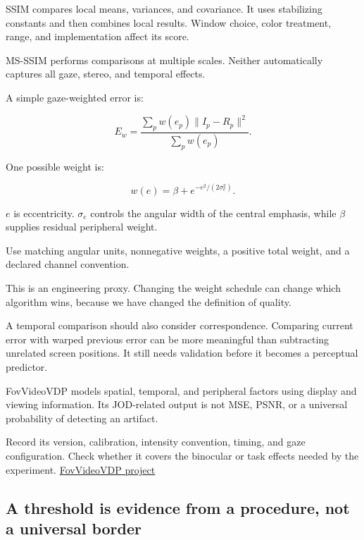 \hypertarget{04-visual-computing-ii-ch043-structural-and-gaze-aware-comparisons-add-assumptions}{}

SSIM compares local means, variances, and covariance. It uses stabilizing constants and then combines local results. Window choice, color treatment, range, and implementation affect its score.

MS-SSIM performs comparisons at multiple scales. Neither automatically captures all gaze, stereo, and temporal effects.

A simple gaze-weighted error is:

\[
E_w=
\frac{\sum_p w(e_p)\lVert I_p-R_p\rVert^2}
{\sum_p w(e_p)}.
\]

One possible weight is:

\[
w(e)=\beta+e^{-e^2/(2\sigma_e^2)}.
\]

\(e\) is eccentricity. \(\sigma_e\) controls the angular width of the central emphasis, while \(\beta\) supplies residual peripheral weight.

Use matching angular units, nonnegative weights, a positive total weight, and a declared channel convention.

This is an engineering proxy. Changing the weight schedule can change which algorithm wins, because we have changed the definition of quality.

A temporal comparison should also consider correspondence. Comparing current error with warped previous error can be more meaningful than subtracting unrelated screen positions. It still needs validation before it becomes a perceptual predictor.

FovVideoVDP models spatial, temporal, and peripheral factors using display and viewing information. Its JOD-related output is not MSE, PSNR, or a universal probability of detecting an artifact.

Record its version, calibration, intensity convention, timing, and gaze configuration. Check whether it covers the binocular or task effects needed by the experiment. \href{https://www.cl.cam.ac.uk/research/rainbow/projects/fovvideovdp/}{FovVideoVDP project}

\subsection{A threshold is evidence from a procedure, not a universal border}\label{04-visual-computing-ii-ch043-a-threshold-is-evidence-from-a-procedure-not-a-universal-border}

\hypertarget{04-visual-computing-ii-ch043-a-threshold-is-evidence-from-a-procedure-not-a-universal-border}{}

